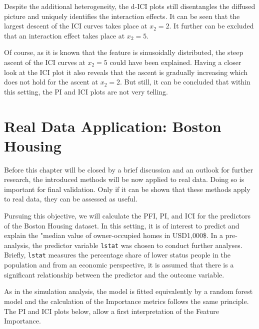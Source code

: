 \documentclass[
]{krantz}
\begin{document}
Despite the additional heterogeneity, the d-ICI plots still disentangles the diffused picture and uniquely identifies the interaction effects. It can be seen that the largest descent of the ICI curves takes place at \(x_2 = 2\). It further can be excluded that an interaction effect takes place at \(x_2 = 5\).

Of course, as it is known that the feature is sinusoidally distributed, the steep ascent of the ICI curves at \(x_2 = 5\) could have been explained. Having a closer look at the ICI plot it also reveals that the ascent is gradually increasing which does not hold for the ascent at \(x_2 = 2\). But still, it can be concluded that within this setting, the PI and ICI plots are not very telling.

\pagebreak
\pagebreak

\hypertarget{ch4}{%
\section{Real Data Application: Boston Housing}\label{ch4}}

Before this chapter will be closed by a brief discussion and an outlook for further research, the introduced methods will be now applied to real data. Doing so is important for final validation. Only if it can be shown that these methods apply to real data, they can be assessed as useful.

Pursuing this objective, we will calculate the PFI, PI, and ICI for the predictors of the Boston Housing dataset. In this setting, it is of interest to predict and explain the "median value of owner-occupied homes in USD1,000\$. In a pre-analysis, the predictor variable \texttt{lstat} was chosen to conduct further analyses. Briefly, \texttt{lstat} measures the percentage share of lower status people in the population and from an economic perspective, it is assumed that there is a significant relationship between the predictor and the outcome variable.

As in the simulation analysis, the model is fitted equivalently by a random forest model and the calculation of the Importance metrics follows the same principle. The PI and ICI plots below, allow a first interpretation of the Feature Importance.
\end{document}
